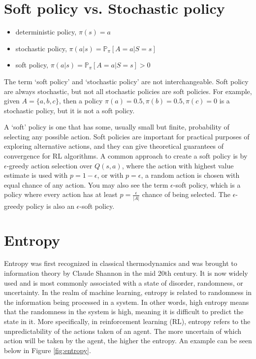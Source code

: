 \documentclass[lang=en,mode=normal,device=normal,color=blue,12pt]{elegantnote}
\DeclareMathOperator*{\1}{\mathbbm{1}}
\begin{document}
\newpage
\begin{appendices}

\section{Soft policy vs. Stochastic policy}

\begin{itemize}
\item deterministic policy, $\pi(s) = a$
\item stochastic policy, $\pi(a|s) = \mathbb{P}_\pi [A=a | S=s]$
\item soft policy, $\pi(a|s) = \mathbb{P}_\pi [A=a | S=s] > 0$
\end{itemize}

The term `soft policy' and `stochastic policy' are not interchangeable. Soft policy are always stochastic, but not all stochastic policies are soft policies. For example, given $A = \{a,b,c\}$, then a policy $\pi(a) = 0.5, \pi(b)=0.5, \pi(c)=0$ is a stochastic policy, but it is not a soft policy.

A `soft' policy is one that has some, usually small but finite, probability of selecting any possible action. Soft policies are important for practical purposes of exploring alternative actions, and they can give theoretical guarantees of convergence for RL algorithms.
A common approach to create a soft policy is by $\epsilon$-greedy action selection over $Q(s,a)$, where the action with highest value estimate is used with $p = 1 - \epsilon$, or with $p = \epsilon$, a random action is chosen with equal chance of any action.
You may also see the term $\epsilon$-soft policy, which is a policy where every action has at least $p = \frac{\epsilon}{|A|}$ chance of being selected.
The $\epsilon$-greedy policy is also an $\epsilon$-soft policy.


\section{Entropy}
\label{appendix:entropy}

Entropy was first recognized in classical thermodynamics and was brought to information theory by Claude Shannon in the mid 20th century. It is now widely used and is most commonly associated with a state of disorder, randomness, or uncertainty.
In the realm of machine learning, entropy is related to randomness in the information being processed in a system. In other words, high entropy means that the randomness in the system is high, meaning it is difficult to predict the state in it. More specifically, in reinforcement learning (RL), entropy refers to the unpredictability of the actions taken of an agent. The more uncertain of which action will be taken by the agent, the higher the entropy. An example can be seen below in Figure \ref{fig:entropy}.


\end{appendices}
\end{document}
